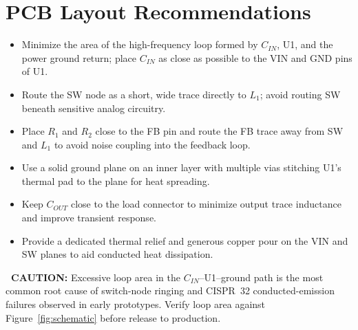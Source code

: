 \section{PCB Layout Recommendations}
\begin{itemize}[leftmargin=1.3em,itemsep=3pt]
\item Minimize the area of the high-frequency loop formed by $C_{IN}$, U1, and
      the power ground return; place $C_{IN}$ as close as possible to the
      VIN and GND pins of U1.
\item Route the SW node as a short, wide trace directly to $L_1$; avoid
      routing SW beneath sensitive analog circuitry.
\item Place $R_1$ and $R_2$ close to the FB pin and route the FB trace away
      from SW and $L_1$ to avoid noise coupling into the feedback loop.
\item Use a solid ground plane on an inner layer with multiple vias
      stitching U1's thermal pad to the plane for heat spreading.
\item Keep $C_{OUT}$ close to the load connector to minimize output
      trace inductance and improve transient response.
\item Provide a dedicated thermal relief and generous copper pour on the
      VIN and SW planes to aid conducted heat dissipation.
\end{itemize}

\begin{tcolorbox}[colback=cautionbg,colframe=caution,boxrule=0.7pt,arc=1pt,
  left=8pt,right=8pt,top=5pt,bottom=5pt]
\textbf{\color{caution}\faExclamationTriangle\ CAUTION:} Excessive loop area
in the $C_{IN}$--U1--ground path is the most common root cause of switch-node
ringing and CISPR~32 conducted-emission failures observed in early
prototypes. Verify loop area against Figure~\ref{fig:schematic} before
release to production.
\end{tcolorbox}

